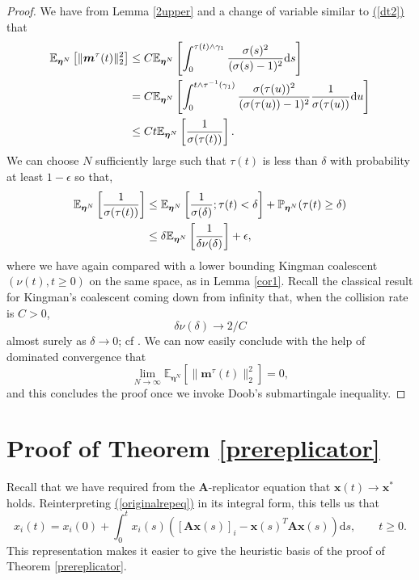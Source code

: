 \documentclass[12pt, leqno]{article}
\renewcommand{\eqref}[1]{\hyperref[#1]{(\ref*{#1})}}
\newcommand*{\norm}[1]{\lVert #1 \rVert}
\newcommand{\dd}{{\mathrm d}}
\begin{document}
\begin{proof}
We have from Lemma \ref{2upper} and a change of variable similar to \eqref{dt2}
that
\begin{align*}
\mathbb{E}_{\bm \eta^N}\left[\norm{\bm m^\tau(t) }^2_2\right] &\leq C\mathbb{E}_{\bm\eta^N}\left[ \int_0^{\tau(t  )\wedge\gamma_1}\frac{\sigma(s)^2}{(\sigma(s)-1)^2} \dd s\right]\notag\\
& = C\mathbb{E}_{\bm\eta^N}\left[ \int_0^{t\wedge\tau^{-1}(\gamma_1)}\frac{\sigma(\tau(u))^2}{(\sigma(\tau(u))-1)^2}\frac{1}{\sigma(\tau(u))} \dd u\right]\notag\\
& \leq C t\mathbb{E}_{\bm \eta^N}\left[\frac{1}{\sigma(\tau(t)) }\right].
\end{align*}
We can choose $N$ sufficiently large such that $\tau(t)$ is less than $\delta$ with probability at least $1-\epsilon$ so that, 
\begin{align*}
\mathbb{E}_{\bm \eta^N}\left[\frac{1}{\sigma(\tau(t))} \right]&\leq \mathbb{E}_{\bm \eta^N}\left[\frac{1}{\sigma(\delta)}  ; \tau(t)< \delta\right] +  \mathbb{P}_{\bm \eta^N}(\tau(t)\geq \delta)\notag \\
&\leq\delta \mathbb{E}_{\bm \eta^N}\left[\frac{1}{\delta\nu(\delta)}\right] + \epsilon,
\end{align*}
where we have again compared with a lower bounding Kingman coalescent $(\nu(t), t\geq0)$ on the same space, as in Lemma \ref{cor1}. Recall the classical result for Kingman's coalescent coming down from infinity that, when the collision rate is $C>0$,
\[
\delta\nu(\delta)\to 2/C
\]
 almost surely as $\delta\to 0$; cf \cite{Brazil}.  We can now easily conclude with the help of dominated convergence that 
\[
\lim_{N\to\infty}\mathbb{E}_{\bm \eta^N}\left[\norm{\bm m^\tau(t)}^2_2\right]  = 0,
\]
and this concludes the proof once we invoke Doob's submartingale inequality. 
\end{proof}




\section{Proof of Theorem \ref{prereplicator}}\label{prepostproofs}
Recall that we have required from the $\bm A$-replicator equation  that  $\bm x(t)\to \bm x^*$ holds. Reinterpreting \eqref{originalrepeq} in its integral form, this tells us that 
\begin{equation}\label{mild}
x_i(t) = x_i(0) +\int_0^t x_i(s)([{\bm A} {\bm x}(s)]_i-{\bm x}(s)^T{\bm A} {\bm x}(s))\dd s, \qquad t\geq0.
\end{equation}
This representation makes it easier to give the heuristic basis of the proof of Theorem \ref{prereplicator}.
\end{document}
